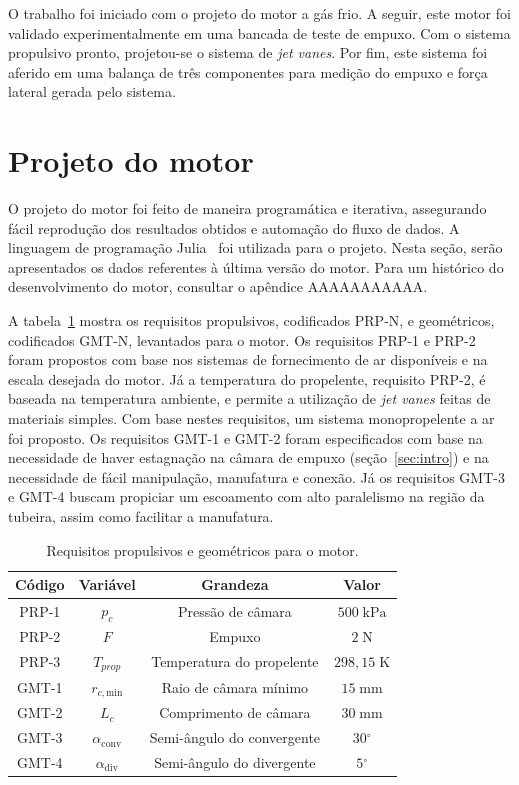 
O trabalho foi iniciado com o projeto do motor a gás frio. A seguir, este motor foi validado experimentalmente em uma bancada de teste de empuxo. Com o sistema propulsivo pronto, projetou-se o sistema de \textit{jet vanes}. Por fim, este sistema foi aferido em uma balança de três componentes para medição do empuxo e força lateral gerada pelo sistema. 

\section{Projeto do motor}\label{sec:motor_project}

O projeto do motor foi feito de maneira programática e iterativa, assegurando fácil reprodução dos resultados obtidos e automação do fluxo de dados. A linguagem de programação Julia~\cite{Julia-2017} foi utilizada para o projeto. Nesta seção, serão apresentados os dados referentes à última versão do motor. Para um histórico do desenvolvimento do motor, consultar o apêndice AAAAAAAAAAA\@.  

A tabela~\ref{tab:requirements} mostra os requisitos propulsivos, codificados PRP-N, e geométricos, codificados GMT-N, levantados para o motor. Os requisitos PRP-1 e PRP-2 foram propostos com base nos sistemas de fornecimento de ar disponíveis e na escala desejada do motor. Já a temperatura do propelente, requisito PRP-2, é baseada na temperatura ambiente, e permite a utilização de \textit{jet vanes} feitas de materiais simples. Com base nestes requisitos, um sistema monopropelente a ar foi proposto. Os requisitos GMT-1 e GMT-2 foram especificados com base na necessidade de haver estagnação na câmara de empuxo (seção~\ref{sec:intro}) e na necessidade de fácil manipulação, manufatura e conexão. Já os requisitos GMT-3 e GMT-4 buscam propiciar um escoamento com alto paralelismo na região da tubeira, assim como facilitar a manufatura.

\begin{table}[htpb]
    \centering\begin{tabular}{cccc} \toprule
        Código & Variável & Grandeza & Valor \\ \midrule
        PRP-1 & \(p_c\) & Pressão de câmara & \(500\;\mathrm{kPa}\) \\
        PRP-2 & \(F\) & Empuxo & \(2\;\mathrm{N}\) \\
        PRP-3 &\(T_{prop}\) & Temperatura do propelente & \(298,15\;\mathrm{K}\) \\
        GMT-1 & \(r_{c,\text{min}}\) & Raio de câmara mínimo & \(15\;\mathrm{mm}\) \\
        GMT-2 & \(L_c\) & Comprimento de câmara & \(30\;\mathrm{mm}\) \\
        GMT-3 & \(\alpha_{\text{conv}}\) & Semi-ângulo do convergente & \(30\mathrm{^\circ} \) \\
        GMT-4 & \(\alpha_{\text{div}}\) & Semi-ângulo do divergente & \(5\mathrm{^\circ} \) \\ \bottomrule 
    \end{tabular}
    \caption{Requisitos propulsivos e geométricos para o motor.}\label{tab:requirements}
\end{table}

